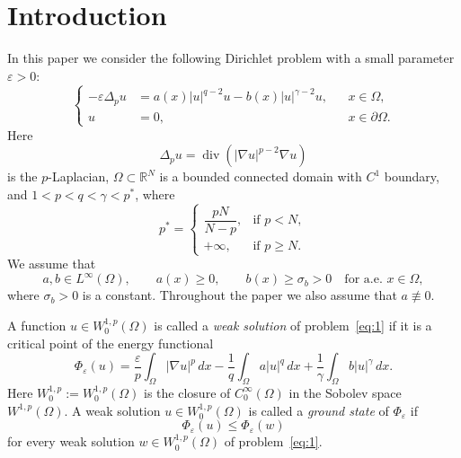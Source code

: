 \documentclass[preprint,11pt]{elsarticle}
\numberwithin{equation}{section}
\begin{document}
\section{Introduction}

In this paper we consider the following Dirichlet problem with a small
parameter \(\varepsilon>0\):
\begin{equation}\label{eq:1}
	\left\{
	\begin{aligned}
		-\varepsilon \Delta_p u
		&=
		a(x)|u|^{q-2}u
		-
		b(x)|u|^{\gamma-2}u,
		&& x\in\Omega,\\
		u&=0,
		&& x\in\partial\Omega .
	\end{aligned}
	\right.
\end{equation}
Here
\[
\Delta_p u
=
\operatorname{div}\!\left(|\nabla u|^{p-2}\nabla u\right)
\]
is the \(p\)-Laplacian, \(\Omega\subset\mathbb R^N\) is a bounded connected
domain with \(C^1\) boundary, and \(1<p<q<\gamma<p^*\), where
\[
p^* =
\begin{cases}
	\dfrac{pN}{N-p}, & \text{if } p<N, \\[4pt]
	+\infty,         & \text{if } p\ge N .
\end{cases}
\]
We assume that
\begin{equation}\label{eq:Condab}
	a,b\in L^\infty(\Omega),\qquad
	a(x)\ge0,\qquad
	b(x)\ge\sigma_b>0
	\quad\text{for a.e. }x\in\Omega ,
\end{equation}
where \(\sigma_b>0\) is a constant. Throughout the paper we also assume that
\(a\not\equiv0\).

A function \(u\in W^{1,p}_0(\Omega)\) is called a \emph{weak solution} of
problem~\eqref{eq:1} if it is a critical point of the energy functional
\begin{equation}\label{eq:energy}
	\Phi_\varepsilon(u)
	=
	\frac{\varepsilon}{p}\int_\Omega |\nabla u|^p\,dx
	-
	\frac1q\int_\Omega a|u|^q\,dx
	+
	\frac1\gamma\int_\Omega b|u|^\gamma\,dx .
\end{equation}
Here \(W^{1,p}_0:=W^{1,p}_0(\Omega)\) is the closure of
\(C^\infty_0(\Omega)\) in the Sobolev space \(W^{1,p}(\Omega)\).
A weak solution \(u\in W^{1,p}_0(\Omega)\) is called a \emph{ground state}
of \(\Phi_\varepsilon\) if
\[
\Phi_\varepsilon(u)\le \Phi_\varepsilon(w)
\]
for every weak solution \(w\in W^{1,p}_0(\Omega)\) of problem~\eqref{eq:1}.
\end{document}
